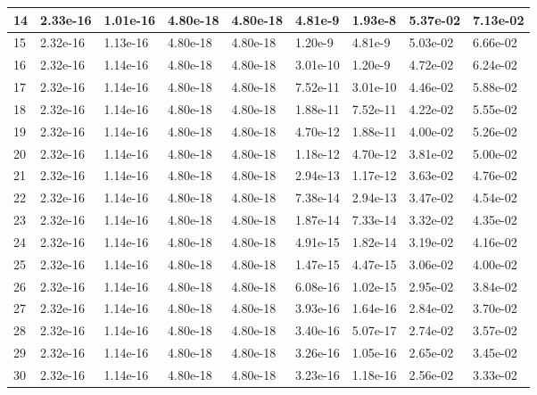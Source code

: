 \documentclass[soc]{gzwroc} %
\begin{document}
\begin{table}[h!]
\begin{tabular}{|l|l|l|l|l|l|l|l|l|}
14 & 2.33e-16 & 1.01e-16 & 4.80e-18 & 4.80e-18 & 4.81e-9 & 1.93e-8 & 5.37e-02 & 7.13e-02 \\ \hline 
15 & 2.32e-16 & 1.13e-16 & 4.80e-18 & 4.80e-18 & 1.20e-9 & 4.81e-9 & 5.03e-02 & 6.66e-02 \\ \hline 
16 & 2.32e-16 & 1.14e-16 & 4.80e-18 & 4.80e-18 & 3.01e-10 & 1.20e-9 & 4.72e-02 & 6.24e-02 \\ \hline 
17 & 2.32e-16 & 1.14e-16 & 4.80e-18 & 4.80e-18 & 7.52e-11 & 3.01e-10 & 4.46e-02 & 5.88e-02 \\ \hline 
18 & 2.32e-16 & 1.14e-16 & 4.80e-18 & 4.80e-18 & 1.88e-11 & 7.52e-11 & 4.22e-02 & 5.55e-02 \\ \hline 
19 & 2.32e-16 & 1.14e-16 & 4.80e-18 & 4.80e-18 & 4.70e-12 & 1.88e-11 & 4.00e-02 & 5.26e-02 \\ \hline 
20 & 2.32e-16 & 1.14e-16 & 4.80e-18 & 4.80e-18 & 1.18e-12 & 4.70e-12 & 3.81e-02 & 5.00e-02 \\ \hline 
21 & 2.32e-16 & 1.14e-16 & 4.80e-18 & 4.80e-18 & 2.94e-13 & 1.17e-12 & 3.63e-02 & 4.76e-02 \\ \hline 
22 & 2.32e-16 & 1.14e-16 & 4.80e-18 & 4.80e-18 & 7.38e-14 & 2.94e-13 & 3.47e-02 & 4.54e-02 \\ \hline 
23 & 2.32e-16 & 1.14e-16 & 4.80e-18 & 4.80e-18 & 1.87e-14 & 7.33e-14 & 3.32e-02 & 4.35e-02 \\ \hline 
24 & 2.32e-16 & 1.14e-16 & 4.80e-18 & 4.80e-18 & 4.91e-15 & 1.82e-14 & 3.19e-02 & 4.16e-02 \\ \hline 
25 & 2.32e-16 & 1.14e-16 & 4.80e-18 & 4.80e-18 & 1.47e-15 & 4.47e-15 & 3.06e-02 & 4.00e-02 \\ \hline 
26 & 2.32e-16 & 1.14e-16 & 4.80e-18 & 4.80e-18 & 6.08e-16 & 1.02e-15 & 2.95e-02 & 3.84e-02 \\ \hline 
27 & 2.32e-16 & 1.14e-16 & 4.80e-18 & 4.80e-18 & 3.93e-16 & 1.64e-16 & 2.84e-02 & 3.70e-02 \\ \hline 
28 & 2.32e-16 & 1.14e-16 & 4.80e-18 & 4.80e-18 & 3.40e-16 & 5.07e-17 & 2.74e-02 & 3.57e-02 \\ \hline 
29 & 2.32e-16 & 1.14e-16 & 4.80e-18 & 4.80e-18 & 3.26e-16 & 1.05e-16 & 2.65e-02 & 3.45e-02 \\ \hline 
30 & 2.32e-16 & 1.14e-16 & 4.80e-18 & 4.80e-18 & 3.23e-16 & 1.18e-16 & 2.56e-02 & 3.33e-02 \\ \hline 
\end{tabular}
\end{table}
\end{document}
